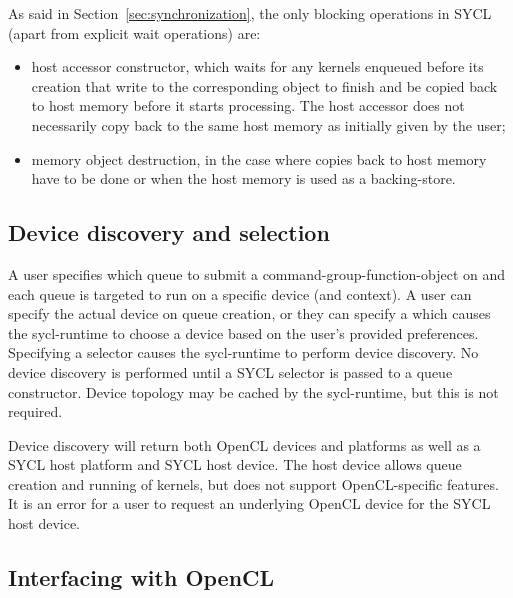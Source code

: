 As said in Section~\ref{sec:synchronization}, the only blocking
operations in SYCL (apart from explicit wait operations) are:
\begin{itemize}
\item host accessor constructor, which waits for any kernels enqueued before
its creation that write to the corresponding object to finish and be copied back
to host memory before it starts processing. The host accessor does not
necessarily copy back to the same host memory as initially given by the
user;
\item memory object destruction, in the case where copies back to host memory
have to be done or when the host memory is used as a backing-store.
\end{itemize}


\subsection{Device discovery and selection}

A user specifies which queue to submit a \gls{command-group-function-object} on and
each queue is targeted to run on a specific device (and context). A user can specify
the actual device on queue creation, or they can specify a 
which causes the \gls{sycl-runtime} to choose a device based on the user's provided
preferences. Specifying a selector causes the \gls{sycl-runtime} to perform device
discovery. No device discovery is performed until a SYCL selector is passed to a
queue constructor. Device topology may be cached by the \gls{sycl-runtime}, but this
is not required.

Device discovery will return both OpenCL devices and platforms as well as a
SYCL host platform and SYCL host device. The host device allows queue creation
and running of kernels, but does not support OpenCL-specific features. It is an
error for a user to request an underlying OpenCL device for the SYCL host device.

\subsection{Interfacing with OpenCL}
\label{sec:interfacing-with-opencl}

